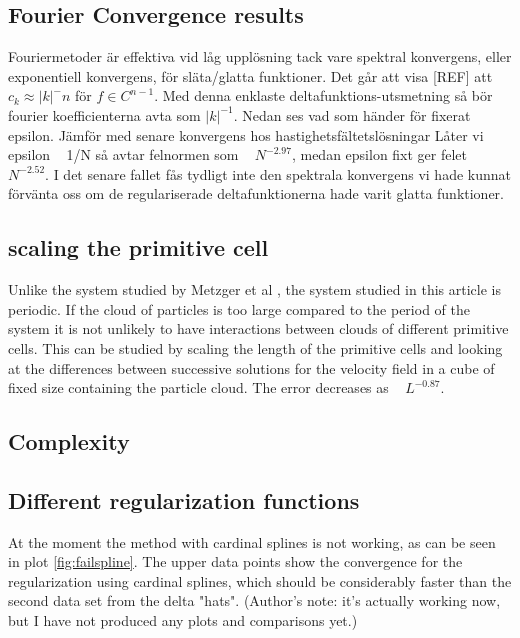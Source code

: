 \documentclass[a4paper,twoside=false,abstract=false,numbers=noenddot,
titlepage=false,headings=small,parskip=half,version=last]{scrartcl}
\begin{document}
\subsection{Fourier Convergence results}
Fouriermetoder är effektiva vid låg upplösning tack vare spektral konvergens, eller exponentiell konvergens, för släta/glatta funktioner. Det går att visa [REF] att $c_k \approx |k|^-n$ för $f \in C^{n-1}$.
Med denna enklaste deltafunktions-utsmetning så bör fourier koefficienterna avta som $|k|^{-1}$.
Nedan ses vad som händer för fixerat epsilon. Jämför med senare 
konvergens hos hastighetsfältetslösningar
Låter vi epsilon ~ 1/N så avtar felnormen som ~ $N^{-2.97}$, medan epsilon fixt ger felet ~ $N^{-2.52}$. I det senare fallet fås tydligt inte den spektrala konvergens vi hade kunnat förvänta oss om de regulariserade deltafunktionerna hade varit glatta funktioner.

\subsection{scaling the primitive cell}\label{cellscale}
Unlike the system studied by Metzger et al \cite{fallingclouds}, the system studied in this article is periodic. If the cloud of particles is too large compared to the period of the system it is not unlikely to have interactions between clouds of different primitive cells. This can be studied by scaling the length of the primitive cells and looking at the differences between successive solutions for the velocity field in a cube of fixed size containing the particle cloud. The error decreases as ~ $L^{-0.87}$.

\subsection{Complexity}
\subsection{Different regularization functions}
At the moment the method with cardinal splines is not working, as can be seen in plot \ref{fig:failspline}. The upper data points show the convergence for the regularization using cardinal splines, which should be considerably faster than the second data set from the delta "hats". (Author's note: it's actually working now, but I have not produced any plots and comparisons yet.)
\end{document}
